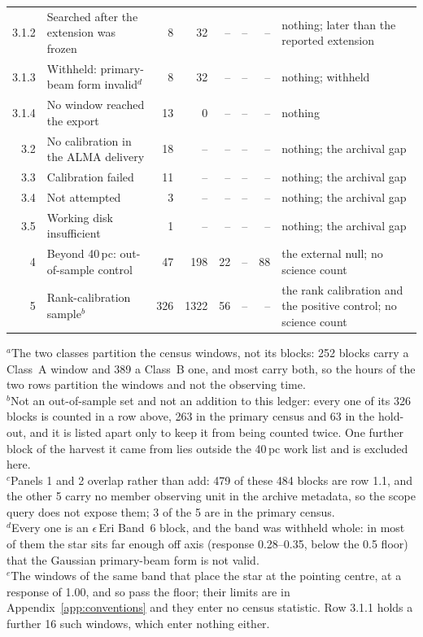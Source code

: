 \begin{tabular}{@{}r@{~}p{}rrrrrp{}@{}}
3.1.2 & \hspace{1.6em}Searched after the extension was frozen & 8 & 32 & -- & -- & -- & nothing; later than the reported extension \\
3.1.3 & \hspace{1.6em}Withheld: primary-beam form invalid$^{d}$ & 8 & 32 & -- & -- & -- & nothing; withheld \\
3.1.4 & \hspace{1.6em}No window reached the export & 13 & 0 & -- & -- & -- & nothing \\
3.2 & \hspace{0.8em}No calibration in the ALMA delivery & 18 & -- & -- & -- & -- & nothing; the archival gap \\
3.3 & \hspace{0.8em}Calibration failed & 11 & -- & -- & -- & -- & nothing; the archival gap \\
3.4 & \hspace{0.8em}Not attempted & 3 & -- & -- & -- & -- & nothing; the archival gap \\
3.5 & \hspace{0.8em}Working disk insufficient & 1 & -- & -- & -- & -- & nothing; the archival gap \\
\hline
4 & Beyond 40\,pc: out-of-sample control & 47 & 198 & 22 & -- & 88 & the external null; no science count \\
5 & Rank-calibration sample$^{b}$ & 326 & 1322 & 56 & -- & -- & the rank calibration and the positive control; no science count \\
\hline
\end{tabular}

{\footnotesize $^{a}$The two classes partition the census windows, not its blocks: 252 blocks carry a Class~A window and 389 a Class~B one, and most carry both, so the hours of the two rows partition the windows and not the observing time.\\ $^{b}$Not an out-of-sample set and not an addition to this ledger: every one of its 326 blocks is counted in a row above, 263 in the primary census and 63 in the hold-out, and it is listed apart only to keep it from being counted twice. One further block of the harvest it came from lies outside the 40\,pc work list and is excluded here.\\ $^{c}$Panels 1 and 2 overlap rather than add: 479 of these 484 blocks are row 1.1, and the other 5 carry no member observing unit in the archive metadata, so the scope query does not expose them; 3 of the 5 are in the primary census.\\ $^{d}$Every one is an $\epsilon$\,Eri Band~6 block, and the band was withheld whole: in most of them the star sits far enough off axis (response 0.28--0.35, below the 0.5 floor) that the Gaussian primary-beam form is not valid.\\ $^{e}$The windows of the same band that place the star at the pointing centre, at a response of 1.00, and so pass the floor; their limits are in Appendix~\ref{app:conventions} and they enter no census statistic. Row 3.1.1 holds a further 16 such windows, which enter nothing either.}
